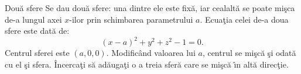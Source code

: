 \begin{surferPage}{Dou\u a sfere}
Se dau dou\u a sfere: una dintre ele este fix\u a, iar cealalt\u a se poate mi\c sca de-a lungul axei $x$-ilor prin schimbarea parametrului $a$. Ecua\c tia celei de-a doua sfere este dat\u a de:
\[(x-a)^2+y^2+z^2-1=0.\]
Centrul sferei este $(a,0,0)$. Modific\^and valoarea lui $a$, centrul se mi\c sc\u a \c si odat\u a cu el \c si sfera. \^Incerca\c ti s\u a ad\u auga\c ti o a treia sfer\u a care se  mi\c sc\u a \^\i n alt\u a direc\c tie.
\end{surferPage}
